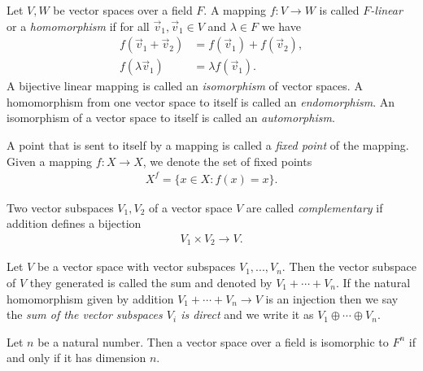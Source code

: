 \documentclass{article}
\begin{document}
\begin{definition}
    Let $V,W$ be vector spaces over a field $F$. A mapping $f:V\to W$ is called
    \emph{$F$-linear} or a \emph{homomorphism} if for all $\vec v_1,\vec v_1\in V$ and $\lambda \in F$ we
    have
    \begin{align*}
        f(\vec v_1+\vec v_2) & = f(\vec v_1) + f(\vec v_2), \\
        f(\lambda \vec v_1)  & = \lambda f(\vec v_1).
    \end{align*}
    A bijective linear mapping is called an \emph{isomorphism} of vector spaces.
    A homomorphism from one vector space to itself is called an \emph{endomorphism}.
    An isomorphism of a vector space to itself is called an \emph{automorphism}.
\end{definition}

\begin{definition}
    A point that is sent to itself by a mapping is called a \emph{fixed point} of
    the mapping. Given a mapping $f:X\to X$, we denote the set of fixed points
    \begin{align*}
        X^f = \{x\in X : f(x)=x\}.
    \end{align*}
\end{definition}

\begin{definition}
    Two vector subspaces $V_1,V_2$ of a vector space $V$ are called \emph{complementary}
    if addition defines a bijection
    \begin{align*}
        V_1\times V_2 \to V.
    \end{align*}
\end{definition}

\begin{definition}
    Let $V$ be a vector space with vector subspaces $V_1,...,V_n$. Then the vector
    subspace of $V$ they generated is called the sum and denoted by $V_1+\cdots+V_n$.
    If the natural homomorphism given by addition $V_1+\cdots +V_n\to V$ is an
    injection then we say the \emph{sum of the vector subspaces $V_i$ is direct} and
    we write it as $V_1\oplus\cdots\oplus V_n$.
\end{definition}

\begin{theorem}[Notes 1.7.7]
    Let $n$ be a natural number. Then a vector space over a field is isomorphic
    to $F^n$ if and only if it has dimension $n$.
\end{theorem}
\end{document}

